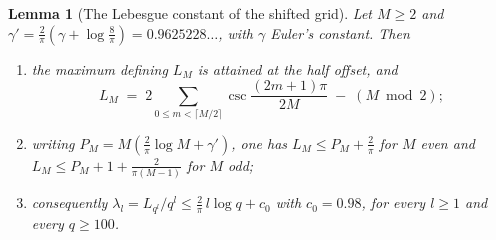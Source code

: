 \documentclass[11pt]{amsart}
\newtheorem{lemma}[theorem]{Lemma}
\theoremstyle{definition}
\theoremstyle{remark}
\begin{document}
\begin{lemma}[The Lebesgue constant of the shifted grid]
\label{lem:leb}
Let $M \ge 2$ and $\gamma' = \frac{2}{\pi}\left(\gamma + \log\frac{8}{\pi}\right) = 0.9625228\ldots$, with $\gamma$ Euler's constant. Then
\begin{enumerate}
\item the maximum defining $L_{M}$ is attained at the half offset, and
\[
  L_{M} \;=\; 2\sum_{0 \le m < \lceil M/2\rceil} \csc\frac{(2m+1)\pi}{2M} \;-\; (M \bmod 2);
\]
\item writing $P_{M} = M\!\left(\frac{2}{\pi}\log M + \gamma'\right)$, one has $L_{M} \le P_{M} + \frac{2}{\pi}$ for $M$ even and $L_{M} \le P_{M} + 1 + \frac{2}{\pi(M-1)}$ for $M$ odd;
\item consequently $\lambda_{l} = L_{q^{l}}/q^{l} \le \frac{2}{\pi}\,l\log q + c_{0}$ with $c_{0} = 0.98$, for every $l \ge 1$ and every $q \ge 100$.
\end{enumerate}
\end{lemma}
\end{document}
